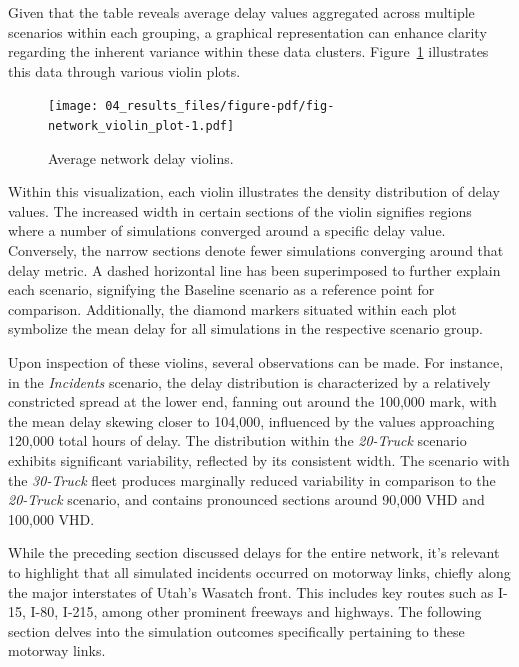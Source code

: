 \documentclass[fancy, oneside, mastersfancy, ms]{byuthesis}
\begin{document}
Given that the table reveals average delay values aggregated across
multiple scenarios within each grouping, a graphical representation can
enhance clarity regarding the inherent variance within these data
clusters. Figure~\ref{fig-network_violin_plot} illustrates this data
through various violin plots.

\begin{figure}

{\centering \texttt{[image: 04\_results\_files/figure-pdf/fig-network\_violin\_plot-1.pdf]}

}

\caption{\label{fig-network_violin_plot}Average network delay violins.}

\end{figure}

Within this visualization, each violin illustrates the density
distribution of delay values. The increased width in certain sections of
the violin signifies regions where a number of simulations converged
around a specific delay value. Conversely, the narrow sections denote
fewer simulations converging around that delay metric. A dashed
horizontal line has been superimposed to further explain each scenario,
signifying the Baseline scenario as a reference point for comparison.
Additionally, the diamond markers situated within each plot symbolize
the mean delay for all simulations in the respective scenario group.

Upon inspection of these violins, several observations can be made. For
instance, in the \emph{Incidents} scenario, the delay distribution is
characterized by a relatively constricted spread at the lower end,
fanning out around the 100,000 mark, with the mean delay skewing closer
to 104,000, influenced by the values approaching 120,000 total hours of
delay. The distribution within the \emph{20-Truck} scenario exhibits
significant variability, reflected by its consistent width. The scenario
with the \emph{30-Truck} fleet produces marginally reduced variability
in comparison to the \emph{20-Truck} scenario, and contains pronounced
sections around 90,000 VHD and 100,000 VHD.

While the preceding section discussed delays for the entire network,
it's relevant to highlight that all simulated incidents occurred on
motorway links, chiefly along the major interstates of Utah's Wasatch
front. This includes key routes such as I-15, I-80, I-215, among other
prominent freeways and highways. The following section delves into the
simulation outcomes specifically pertaining to these motorway links.
\end{document}
